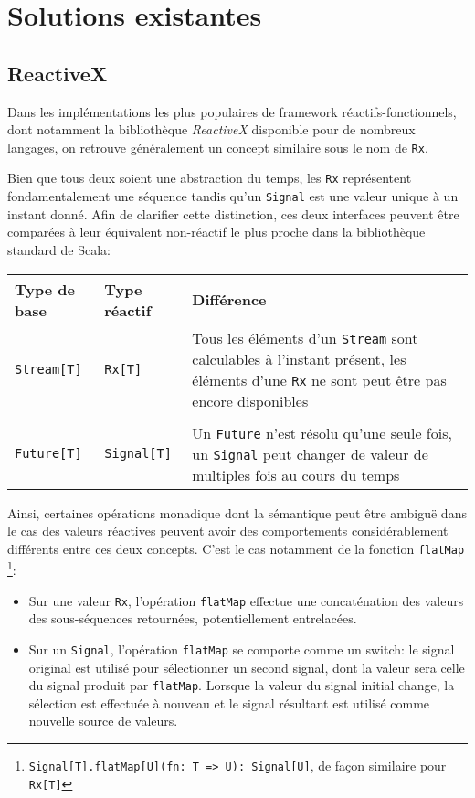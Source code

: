 \section{Solutions existantes}

\subsection{ReactiveX}

Dans les implémentations les plus populaires de framework réactifs-fonctionnels, dont notamment la bibliothèque \emph{ReactiveX} disponible pour de nombreux langages, on retrouve généralement un concept similaire sous le nom de \texttt{Rx}.

Bien que tous deux soient une abstraction du temps, les \texttt{Rx} représentent fondamentalement une séquence tandis qu'un \texttt{Signal} est une valeur unique à un instant donné. Afin de clarifier cette distinction, ces deux interfaces peuvent être comparées à leur équivalent non-réactif le plus proche dans la bibliothèque standard de Scala:

\begin{table}[H]
	\begin{tabular}{@{}p{2.5cm}p{2.5cm}p{\dimexpr\textwidth-6cm\relax}@{}}
		\toprule
		Type de base & Type réactif & Différence \\ \midrule
		\texttt{Stream[T]} & \texttt{Rx[T]} & Tous les éléments d'un \texttt{Stream} sont calculables à l'instant présent, les éléments d'une \texttt{Rx} ne sont peut être pas encore disponibles \\
		&  & \\
		\texttt{Future[T]} & \texttt{Signal[T]} & Un \texttt{Future} n'est résolu qu'une seule fois, un \texttt{Signal} peut changer de valeur de multiples fois au cours du temps \\ \bottomrule
	\end{tabular}
\end{table}

Ainsi, certaines opérations monadique dont la sémantique peut être ambiguë dans le cas des valeurs réactives peuvent avoir des comportements considérablement différents entre ces deux concepts. C'est le cas notamment de la fonction \texttt{flatMap}
\footnote{\texttt{Signal[T].flatMap[U](fn: T => U): Signal[U]}, de façon similaire pour \texttt{Rx[T]}}:

\begin{itemize}
	\item Sur une valeur \texttt{Rx}, l'opération \texttt{flatMap} effectue une concaténation des valeurs des sous-séquences retournées, potentiellement entrelacées.
	\item Sur un \texttt{Signal}, l'opération \texttt{flatMap} se comporte comme un switch: le signal original est utilisé pour sélectionner un second signal, dont la valeur sera celle du signal produit par \texttt{flatMap}. Lorsque la valeur du signal initial change, la sélection est effectuée à nouveau et le signal résultant est utilisé comme nouvelle source de valeurs.
\end{itemize}

